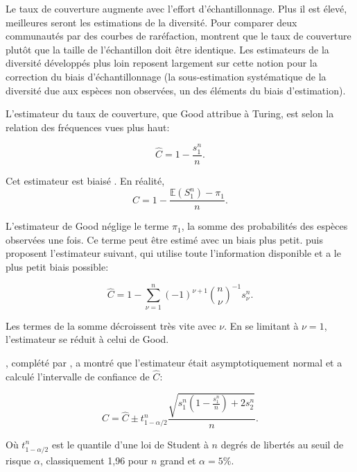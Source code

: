 \documentclass[
  11pt,
  french,
  a4paper,
  extrafontsizes,onecolumn,openright
  ]{memoir}
\begin{document}
Le taux de couverture augmente avec l'effort d'échantillonnage.
Plus il est élevé, meilleures seront les estimations de la diversité.
Pour comparer deux communautés par des courbes de raréfaction, \textcite{Chao2012b} montrent que le taux de couverture plutôt que la taille de l'échantillon doit être identique.
Les estimateurs de la diversité développés plus loin reposent largement sur cette notion pour la correction du biais d'échantillonnage \autocite{Dauby2012} (la sous-estimation systématique de la diversité due aux espèces non observées, un des éléments du biais d'estimation).

L'estimateur du taux de couverture, que Good attribue à Turing, est selon la relation des fréquences vues plus haut:

\begin{equation}
  \label{eq:CGood}
  \hat{C} = 1-\frac{s^{n}_{1}}{n}.
\end{equation}

Cet estimateur est biaisé \autocite{Zhang2007}. En réalité,
\begin{equation}
  \label{eq:CsansBiais}
  C = 1-\frac{{\mathbb E}(S^{n}_{1}) - \pi_1}{n}.
\end{equation}

L'estimateur de Good néglige le terme \(\pi_1\), la somme des probabilités des espèces observées une fois.
Ce terme peut être estimé avec un biais plus petit.
\textcite{Chao1988} puis \textcite{Zhang2007} proposent l'estimateur suivant, qui utilise toute l'information disponible et a le plus petit biais possible:

\begin{equation}
  \label{eq:CZhang}
  \hat{C}=1-\sum^{n}_{\nu=1}{\left(-1\right)}^{\nu+1}{\binom{n}{\nu}}^{-1}s^{n}_{\nu}.
\end{equation}

Les termes de la somme décroissent très vite avec \(\nu\).
En se limitant à \(\nu=1\), l'estimateur se réduit à celui de Good.

\textcite{Esty1983}, complété par \textcite{Zhang2009}, a montré que l'estimateur était asymptotiquement normal et a calculé l'intervalle de confiance de \(\hat{C}\):

\begin{equation}
  \label{eq:hatC}
  C=\hat{C}\pm t^{n}_{1-\alpha/2} \frac{\sqrt{s^{n}_{1}\left(1-\frac{s^{n}_{1}}{n}\right)+2s^{n}_{2}}}{n}.
\end{equation}

Où \(t^{n}_{1-\alpha/2}\) est le quantile d'une loi de Student à \(n\) degrés de libertés au seuil de risque \(\alpha\), classiquement 1,96 pour \(n\) grand et \(\alpha=5\%\).
\end{document}
